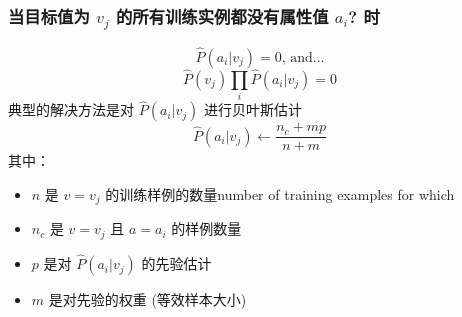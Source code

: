\documentclass{beamer}
\begin{document}
\begin{frame}
\frametitle{当目标值为 $v_j$ 的所有训练实例都没有属性值 $a_i$? 时}
\label{sec-8-6}

    $$\hat{P}(a_i|v_j) = 0 \mbox{, and...}$$
    $$\hat{P}(v_{j}) \prod_{i} \hat{P}(a_{i} | v_{j}) = 0$$
    典型的解决方法是对 $\hat{P}(a_{i} | v_{j})$ 进行贝叶斯估计
       $$\hat{P}(a_{i} | v_{j}) \leftarrow \frac{n_{c} + mp}{n + m}$$
    其中：
\begin{itemize}
\item $n$ 是 $v=v_j$ 的训练样例的数量number of training examples for which
\item $n_c$ 是 $v=v_j$ 且 $a=a_i$ 的样例数量
\item $p$ 是对 $\hat{P}(a_{i} | v_{j})$ 的先验估计
\item $m$ 是对先验的权重 (等效样本大小)
\end{itemize}
\end{frame}
\end{document}
